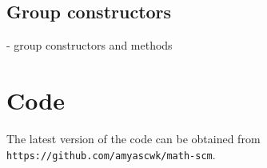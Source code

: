 \documentclass{article}
\begin{document}
        \subsection{Group constructors}
            
            - group constructors and methods
    
    
    \section{Code}
        
        The latest version of the code can be obtained from \texttt{https://github.com/amyascwk/math-scm}.
        
    
\end{document}

